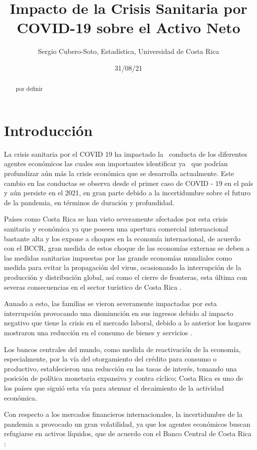 \documentclass[
]{article}
\title{Impacto de la Crisis Sanitaria por COVID-19 sobre el Activo Neto}
\author{Sergio Cubero-Soto, Estadística, Universidad de Costa Rica}
\date{31/08/21}
\begin{document}
\maketitle
\begin{abstract}
por definir
\end{abstract}

\hypertarget{introducciuxf3n}{%
\section{Introducción}\label{introducciuxf3n}}

La crisis sanitaria por el COVID 19 ha impactado la~ conducta de los diferentes agentes económicos las cuales son importantes identificar ya~ que podrían profundizar aún más la crisis económica que se desarrolla actualmente. Este cambio en las conductas se observa desde el primer caso de COVID - 19 en el país y aún persiste en el 2021, en gran parte debido a la incertidumbre sobre el futuro de la pandemia, en términos de duración y profundidad.

Países como Costa Rica se han visto severamente afectados por esta crisis sanitaria y económica ya que poseen una apertura comercial internacional bastante alta y los expone a choques en la economía internacional, de acuerdo con el BCCR, gran medida de estos choque de las economías externas se deben a las medidas sanitarias impuestas por las grande economías mundiales como medida para evitar la propagación del virus, ocasionando la interrupción de la producción y distribución global, así como el cierre de fronteras, esta última con severas consecuencias en el sector turístico de Costa Rica \autocite{bccr1}.

Aunado a esto, las familias se vieron severamente impactadas por esta interrupción provocando una disminución en sus ingresos debido al impacto negativo que tiene la crisis en el mercado laboral, debido a lo anterior los hogares mostraron una reducción en el consumo de bienes y servicios \autocite{bccr1}.

Los bancos centrales del mundo, como medida de reactivación de la economía, especialmente, por la vía del otorgamiento del crédito para consumo o productivo, establecieron una reducción en las tasas de interés, tomando una posición de política monetaria expansiva y contra cíclico; Costa Rica es uno de los países que siguió esta vía para atenuar el decaimiento de la actividad económica.

Con respecto a los mercados financieros internacionales, la incertidumbre de la pandemia a provocado un gran volatilidad, ya que los agentes económicos buscan refugiarse en activos líquidos, que de acuerdo con el Banco Central de Costa Rica \autocite{bccr1} :
\end{document}
